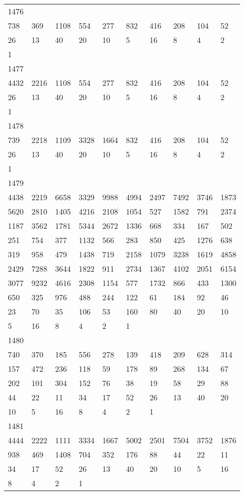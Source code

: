 \begin{longtable}{*{10}{l}}
1476&&&&&&&&&\\
738& 369& 1108& 554& 277& 832& 416& 208& 104& 52\\
26& 13& 40& 20& 10& 5& 16& 8& 4& 2\\
1& \\

1477&&&&&&&&&\\
4432& 2216& 1108& 554& 277& 832& 416& 208& 104& 52\\
26& 13& 40& 20& 10& 5& 16& 8& 4& 2\\
1& \\

1478&&&&&&&&&\\
739& 2218& 1109& 3328& 1664& 832& 416& 208& 104& 52\\
26& 13& 40& 20& 10& 5& 16& 8& 4& 2\\
1& \\

1479&&&&&&&&&\\
4438& 2219& 6658& 3329& 9988& 4994& 2497& 7492& 3746& 1873\\
5620& 2810& 1405& 4216& 2108& 1054& 527& 1582& 791& 2374\\
1187& 3562& 1781& 5344& 2672& 1336& 668& 334& 167& 502\\
251& 754& 377& 1132& 566& 283& 850& 425& 1276& 638\\
319& 958& 479& 1438& 719& 2158& 1079& 3238& 1619& 4858\\
2429& 7288& 3644& 1822& 911& 2734& 1367& 4102& 2051& 6154\\
3077& 9232& 4616& 2308& 1154& 577& 1732& 866& 433& 1300\\
650& 325& 976& 488& 244& 122& 61& 184& 92& 46\\
23& 70& 35& 106& 53& 160& 80& 40& 20& 10\\
5& 16& 8& 4& 2& 1& \\

1480&&&&&&&&&\\
740& 370& 185& 556& 278& 139& 418& 209& 628& 314\\
157& 472& 236& 118& 59& 178& 89& 268& 134& 67\\
202& 101& 304& 152& 76& 38& 19& 58& 29& 88\\
44& 22& 11& 34& 17& 52& 26& 13& 40& 20\\
10& 5& 16& 8& 4& 2& 1& \\

1481&&&&&&&&&\\
4444& 2222& 1111& 3334& 1667& 5002& 2501& 7504& 3752& 1876\\
938& 469& 1408& 704& 352& 176& 88& 44& 22& 11\\
34& 17& 52& 26& 13& 40& 20& 10& 5& 16\\
8& 4& 2& 1& \\


\end{longtable}
